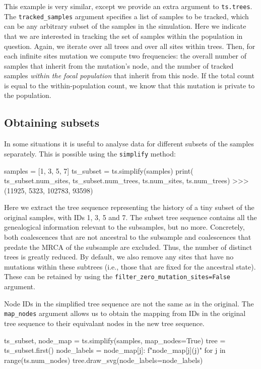 \documentclass[graybox]{svmult}
\begin{document}
    This example is very similar, except we provide an extra argument to
\texttt{ts.trees}. The \texttt{tracked\_samples} argument specifies a list of samples to be tracked, which can be
any arbitrary subset of the samples in the simulation. Here we indicate
that we are interested in tracking the set of samples within the
population in question. Again, we iterate over all trees and over all
sites within trees. Then, for each infinite sites mutation we
compute two frequencies: the overall number of samples that inherit from
the mutation's node, and the number of tracked samples \emph{within the focal
population} that inherit from this node. If the total count is
equal to the within-population count, we know that this mutation is private to the population.

\subsection{Obtaining subsets}\label{obtaining-subsets}

In some situations it is useful to analyse data for different subsets of
the samples separately. This is possible using the \texttt{simplify}
method:

\begin{pythoncode}
samples = [1, 3, 5, 7]
ts_subset = ts.simplify(samples)
print(
    ts_subset.num_sites, ts_subset.num_trees,
    ts.num_sites, ts.num_trees)
>>> (11925, 5323, 102783, 93598)
\end{pythoncode}

Here we extract the tree sequence representing the history of a tiny
subset of the original samples, with IDs 1, 3, 5 and 7. The subset tree
sequence contains all the genealogical information relevant to the
subsamples, but no more. Concretely, both coalescences that are not ancestral to the
subsample and coalescences that predate
the MRCA of the subsample are excluded. Thus, the number of distinct trees is greatly
reduced. By default, we also remove any sites that have no mutations
within these subtrees (i.e., those that are fixed for the ancestral
state). These can be retained by using the
\texttt{filter\_zero\_mutation\_sites=False} argument.

Node IDs in the simplified tree sequence are not the same as in the
original. The \texttt{map\_nodes} argument allows us to obtain the
mapping from IDs in the original tree sequence to their equivalant nodes
in the new tree sequence.

\begin{pythoncode}
ts_subset, node_map = ts.simplify(samples, map_nodes=True)
tree = ts_subset.first()
node_labels = {
    node_map[j]: f"{node_map[j]}({j})"
    for j in range(ts.num_nodes)}
tree.draw_svg(node_labels=node_labels)
\end{pythoncode}
\end{document}
